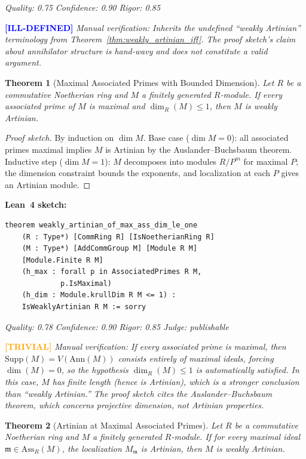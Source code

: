 \documentclass[11pt,a4paper]{article}
\newtheorem{theorem}{Theorem}
\begin{document}
\medskip
\noindent\emph{Quality: 0.75 \quad Confidence: 0.90 \quad Rigor: 0.85}

\noindent\textcolor{blue}{\textbf{[ILL-DEFINED]}} \emph{Manual verification: Inherits the undefined ``weakly Artinian'' terminology from Theorem~\ref{thm:weakly_artinian_iff}. The proof sketch's claim about annihilator structure is hand-wavy and does not constitute a valid argument.}


\begin{theorem}[Maximal Associated Primes with Bounded Dimension]
\label{thm:max_ass_dim}
Let $R$ be a commutative Noetherian ring and $M$ a finitely generated $R$-module. If every associated prime of $M$ is maximal and $\dim_R(M) \leq 1$, then $M$ is weakly Artinian.
\end{theorem}

\begin{proof}[Proof sketch]
By induction on $\dim M$. Base case ($\dim M = 0$): all associated primes maximal implies $M$ is Artinian by the Auslander--Buchsbaum theorem. Inductive step ($\dim M = 1$): $M$ decomposes into modules $R/P^m$ for maximal $P$; the dimension constraint bounds the exponents, and localization at each $P$ gives an Artinian module.
\end{proof}

\noindent\textbf{Lean~4 sketch:}
\begin{verbatim}
theorem weakly_artinian_of_max_ass_dim_le_one
    (R : Type*) [CommRing R] [IsNoetherianRing R]
    (M : Type*) [AddCommGroup M] [Module R M]
    [Module.Finite R M]
    (h_max : forall p in AssociatedPrimes R M,
             p.IsMaximal)
    (h_dim : Module.krullDim R M <= 1) :
    IsWeaklyArtinian R M := sorry
\end{verbatim}

\medskip
\noindent\emph{Quality: 0.78 \quad Confidence: 0.90 \quad Rigor: 0.85 \quad Judge: publishable}

\noindent\textcolor{orange}{\textbf{[TRIVIAL]}} \emph{Manual verification: If every associated prime is maximal, then $\mathrm{Supp}(M) = V(\mathrm{Ann}(M))$ consists entirely of maximal ideals, forcing $\dim(M) = 0$, so the hypothesis $\dim_R(M) \leq 1$ is automatically satisfied. In this case, $M$ has finite length (hence is Artinian), which is a stronger conclusion than ``weakly Artinian.'' The proof sketch cites the Auslander--Buchsbaum theorem, which concerns projective dimension, not Artinian properties.}


\begin{theorem}[Artinian at Maximal Associated Primes]
\label{thm:artinian_max_ass}
Let $R$ be a commutative Noetherian ring and $M$ a finitely generated $R$-module. If for every maximal ideal $\mathfrak{m} \in \mathrm{Ass}_R(M)$, the localization $M_{\mathfrak{m}}$ is Artinian, then $M$ is weakly Artinian.
\end{theorem}
\end{document}
